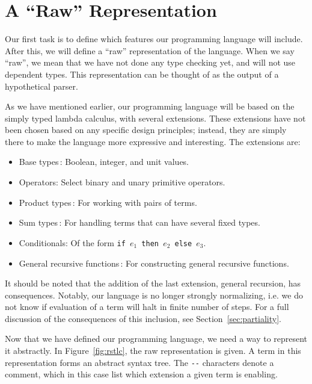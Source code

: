 \section{A ``Raw'' Representation}
\label{sec:the-simply-typed-lambda-calculus}

Our first task is to define which features our programming language will include. After this, we will define a ``raw'' representation of the language. When we say ``raw'', we mean that we have not done any type checking yet, and will not use dependent types. This representation can be thought of as the output of a hypothetical parser. 

As we have mentioned earlier, our programming language will be based on the simply typed lambda calculus, with several extensions. These extensions have not been chosen based on any specific design principles; instead, they are simply there to make the language more expressive and interesting. The extensions are:
\begin{itemize}
\item Base types\,\cite[pp. 117]{Pierce:TypeSystems}: Boolean, integer, and unit values.
\item Operators: Select binary and unary primitive operators.
\item Product types\,\cite[pp. 126]{Pierce:TypeSystems}: For working with pairs of terms.
\item Sum types\,\cite[pp. 132]{Pierce:TypeSystems}: For handling terms that can have several fixed types.
\item Conditionals: Of the form \texttt{if $e_{1}$ then $e_{2}$ else $e_{3}$}.
\item General recursive functions\,\cite[pp. 142]{Pierce:TypeSystems}: For constructing general recursive functions.
\end{itemize}

It should be noted that the addition of the last extension, general recursion, has consequences. Notably, our language is no longer strongly normalizing, i.e. we do not know if evaluation of a term will halt in finite number of steps. For a full discussion of the consequences of this inclusion, see Section~\ref{sec:partiality}.

Now that we have defined our programming language, we need a way to represent it abstractly. In Figure~\ref{fig:rstlc}, the raw representation is given. A term in this representation forms an abstract syntax tree. The \verb+--+ characters denote a comment, which in this case list which extension a given term is enabling.

